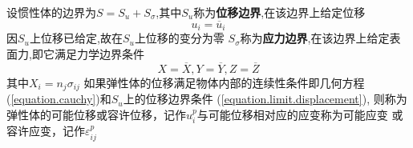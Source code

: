 \documentclass{book}
\begin{document}
设惯性体的边界为$S=S_u+S_{\sigma}$,其中$S_u$称为\textbf{位移边界},在该边界上给定位移
\begin{equation}
u_i=\overline{u}_i
\label{equation.limit.displacement}
\end{equation}
因$S_u$上位移已给定,故在$S_u$上位移的变分为零
$S_\sigma$称为\textbf{应力边界},在该边界上给定表面力,即它满足力学边界条件
\begin{equation}
X=\overline{X},
Y=\overline{Y},
Z=\overline{Z}
\label{equation.limit.contraint}
\end{equation}
其中$X_i=n_j \sigma_{ij}$
如果弹性体的位移满足物体内部的连续性条件即几何方程(\ref{equation.cauchy})和$S_u$上的位移边界条件 (\ref{equation.limit.displacement}),
则称为弹性体的可能位移或容许位移，记作$u_i^p$与可能位移相对应的应变称为可能应变 或容许应变，记作$\varepsilon_{ij}^p$
\end{document}

